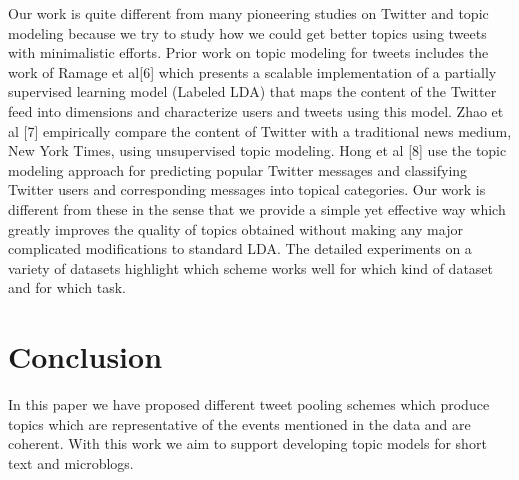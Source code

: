 \documentclass[10pt,a5paper,twoside]{article}
\begin{document}

Our work is quite different from many pioneering studies on Twitter and topic modeling because we try to study how we could get better topics using tweets with minimalistic efforts. Prior work on topic modeling for tweets includes the work of Ramage et al[6] which presents a scalable implementation of a partially supervised learning model (Labeled LDA) that maps the content of the Twitter feed into dimensions and characterize users and tweets using this model. Zhao et al [7] empirically compare the content of Twitter with a traditional news medium, New York Times, using unsupervised topic modeling. Hong et al [8] use the topic modeling approach for predicting popular Twitter messages and classifying Twitter users and corresponding messages into topical categories. Our work is different from these in the sense that we provide a simple yet effective way which greatly improves the quality of topics obtained without making any major complicated modifications to standard LDA. The detailed experiments on a variety of datasets highlight which scheme works well for which kind of dataset and for which task.
\\

\section{Conclusion}
In this paper we have proposed different tweet pooling schemes which produce topics which are representative of the events mentioned in the data and are coherent. With this work we aim to support%
developing topic models for short text and microblogs. %
\end{document}
